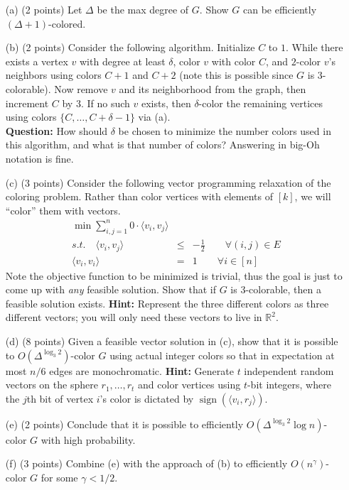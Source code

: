 \documentclass[12pt]{article}
\begin{document}
\begin{itemize}
\item[(a)] (2 points) Let $\Delta$ be the max degree of $G$. Show $G$ can be efficiently $(\Delta+1)$-colored.
\item[(b)] (2 points) Consider the following algorithm. Initialize $C$ to $1$. While there exists a vertex $v$ with degree at least $\delta$, color $v$ with color $C$, and $2$-color $v$'s neighbors using colors $C+1$ and $C+2$ (note this is possible since $G$ is $3$-colorable). Now remove $v$ and its neighborhood from the graph, then increment $C$ by $3$. If no such $v$ exists, then $\delta$-color the remaining vertices using colors $\{C,\ldots,C+\delta-1\}$ via (a).\\ \textbf{Question:} How should $\delta$ be chosen to minimize the number colors used in this algorithm, and what is that number of colors? Answering in big-Oh notation is fine.
\item[(c)] (3 points) Consider the following vector programming relaxation of the coloring problem. Rather than color vertices with elements of $[k]$, we will ``color'' them with vectors.
\begin{eqnarray*}
\min \sum_{i,j=1}^n 0\cdot \langle v_i,v_j\rangle  \\
s.t. \quad \langle v_i,v_j\rangle &\le& -\frac 12 \qquad \forall (i,j)\in E\\
\langle v_i,v_i\rangle &=& 1\qquad \forall i\in [n]
\end{eqnarray*}
Note the objective function to be minimized is trivial, thus the goal is just to come up with {\em any} feasible solution. Show that if $G$ is $3$-colorable, then a feasible solution exists. \textbf{Hint:} Represent the three different colors as three different vectors; you will only need these vectors to live in $\mathbb{R}^2$.
\item[(d)] (8 points) Given a feasible vector solution in (c), show that it is possible to $O(\Delta^{\log_3 2})$-color $G$ using actual integer colors so that in expectation at most $n/6$ edges are monochromatic. \textbf{Hint:} Generate $t$ independent random vectors on the sphere $r_1,\ldots,r_t$ and color vertices using $t$-bit integers, where the $j$th bit of vertex $i$'s color is dictated by $\mathop{sign}(\langle v_i, r_j\rangle)$.
\item[(e)] (2 points) Conclude that it is possible to efficiently $O(\Delta^{\log_3 2}\log n)$-color $G$ with high probability.
\item[(f)] (3 points) Combine (e) with the approach of (b) to efficiently $O(n^\gamma)$-color $G$ for some $\gamma<1/2$.
\end{itemize}
\end{document}

